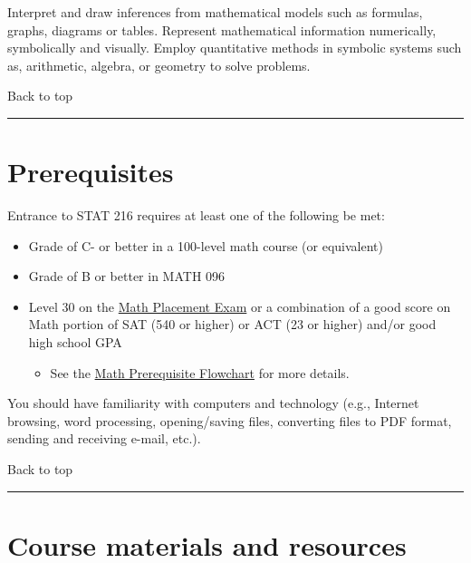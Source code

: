 \documentclass[
]{article}
\providecommand{\tightlist}{%
  \setlength{\itemsep}{0pt}\setlength{\parskip}{0pt}}
\begin{document}
Interpret and draw inferences from mathematical models such as formulas,
graphs, diagrams or tables. Represent mathematical information
numerically, symbolically and visually. Employ quantitative methods in
symbolic systems such as, arithmetic, algebra, or geometry to solve
problems.

Back to top

\begin{center}\rule{0.5\linewidth}{0.5pt}\end{center}

\section{Prerequisites}\label{prerequisites}

Entrance to STAT 216 requires at least one of the following be met:

\begin{itemize}
\tightlist
\item
  Grade of C- or better in a 100-level math course (or equivalent)
\item
  Grade of B or better in MATH 096
\item
  Level 30 on the \href{http://www.montana.edu/testing/MPLEX.html}{Math
  Placement Exam} or a combination of a good score on Math portion of
  SAT (540 or higher) or ACT (23 or higher) and/or good high school GPA

  \begin{itemize}
  \tightlist
  \item
    See the
    \href{http://www.math.montana.edu/undergrad/documents/MHiearchyFlowchart.pdf}{Math
    Prerequisite Flowchart} for more details.
  \end{itemize}
\end{itemize}

You should have familiarity with computers and technology (e.g.,
Internet browsing, word processing, opening/saving files, converting
files to PDF format, sending and receiving e-mail, etc.).

Back to top

\begin{center}\rule{0.5\linewidth}{0.5pt}\end{center}

\section{Course materials and
resources}\label{course-materials-and-resources}
\end{document}
